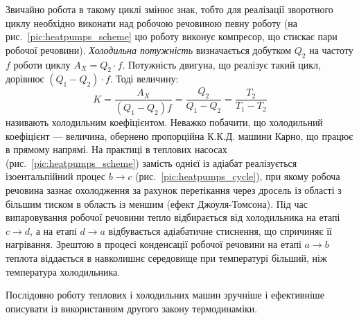 Звичайно робота в такому циклі змінює знак, тобто для реалізації зворотного циклу необхідно виконати
над робочою речовиною певну роботу (на рис.~\ref{pic:heatpumps_scheme} цю роботу виконує компресор, що
стискає пари робочої речовини). \emph{Холодильна потужність} визначається добутком $Q_2$ на
частоту $f$ роботи циклу $A_X = Q_2\cdot f$. Потужність двигуна, що реалізує такий цикл, дорівнює
$(Q_1-Q_2)\cdot f$. Тоді величину:
\begin{equation}\label{2.70}
	K = \dfrac{A_X}{(Q_1-Q_2)f} = \dfrac{Q_2}{Q_1-Q_2} = \dfrac{T_2}{T_1-T_2}
\end{equation}
називають холодильним коефіцієнтом. Неважко побачити, що холодильний коефіцієнт --- величина, обернено
пропорційна К.К.Д. машини Карно, що працює в прямому напрямі. На практиці в теплових насосах
(рис.~\ref{pic:heatpumps_scheme}) замість однієї із адіабат реалізується ізоентальпійний процес
$b\rightarrow c$ (рис.~\ref{pic:heatpumps_cycle}), при якому робоча речовина зазнає охолодження за
рахунок перетікання через дросель із
області з більшим тиском в область із меншим (ефект Джоуля-Томсона). Під час випаровування робочої
речовини тепло відбирається від холодильника на етапі $c\rightarrow d$, а на етапі $d\rightarrow a$
відбувається адіабатичне стиснення, що спричиняє її нагрівання. Зрештою в процесі конденсації робочої
речовини на етапі $a\rightarrow b$ теплота віддається в навколишнє середовище при температурі більший,
ніж температура холодильника.



Послідовно роботу теплових і холодильних машин зручніше і ефективніше описувати із
використанням другого закону термодинаміки.

